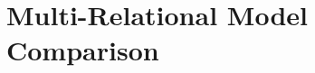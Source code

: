 \documentclass{article}
\begin{document}










\section{Multi-Relational Model Comparison} 
\end{document}
